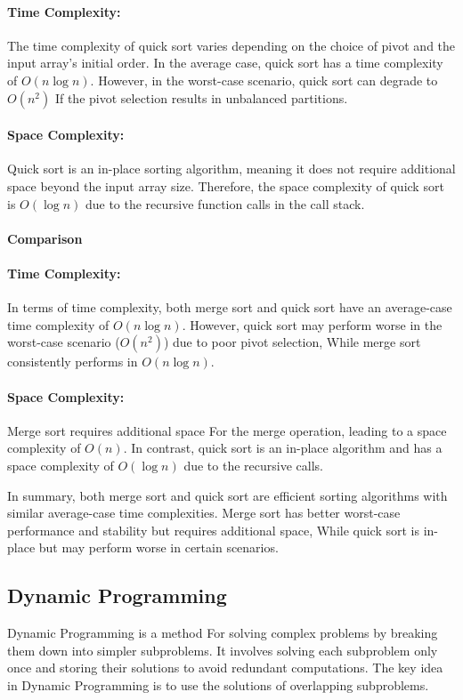 \documentclass[12pt]{book} %
\begin{document}
\paragraph{Time Complexity:}
The time complexity of quick sort varies depending on the choice of pivot and the input array's initial order. In the average case, quick sort has a time complexity of \(O(n \log n)\). However, in the worst-case scenario, quick sort can degrade to \(O(n^2)\) If the pivot selection results in unbalanced partitions.

\paragraph{Space Complexity:}
Quick sort is an in-place sorting algorithm, meaning it does not require additional space beyond the input array size. Therefore, the space complexity of quick sort is \(O(\log n)\) due to the recursive function calls in the call stack.

\paragraph{Comparison}

\paragraph{Time Complexity:}
In terms of time complexity, both merge sort and quick sort have an average-case time complexity of \(O(n \log n)\). However, quick sort may perform worse in the worst-case scenario (\(O(n^2)\)) due to poor pivot selection, While merge sort consistently performs in \(O(n \log n)\).

\paragraph{Space Complexity:}
Merge sort requires additional space For the merge operation, leading to a space complexity of \(O(n)\). In contrast, quick sort is an in-place algorithm and has a space complexity of \(O(\log n)\) due to the recursive calls.

In summary, both merge sort and quick sort are efficient sorting algorithms with similar average-case time complexities. Merge sort has better worst-case performance and stability but requires additional space, While quick sort is in-place but may perform worse in certain scenarios.


\subsection{Dynamic Programming}
Dynamic Programming is a method For solving complex problems by breaking them down into simpler subproblems. It involves solving each subproblem only once and storing their solutions to avoid redundant computations. The key idea in Dynamic Programming is to use the solutions of overlapping subproblems.
\end{document}
